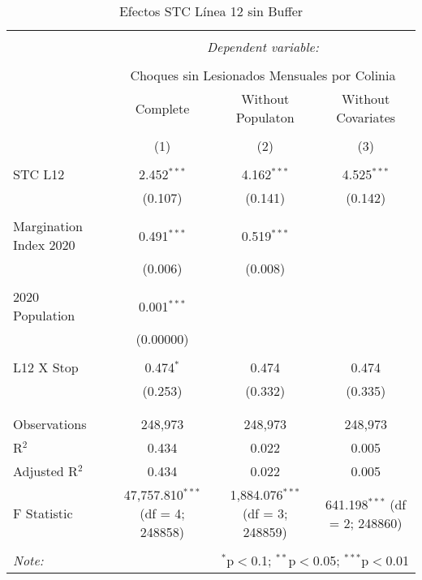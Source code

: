 
\begin{table}[!htbp] \centering 
  \caption{Efectos STC Línea 12 sin Buffer} 
  \label{} 
\begin{tabular}{@{\extracolsep{5pt}}lccc} 
\\[-1.8ex]\hline 
\hline \\[-1.8ex] 
 & \multicolumn{3}{c}{\textit{Dependent variable:}} \\ 
\cline{2-4} 
\\[-1.8ex] & \multicolumn{3}{c}{Choques sin Lesionados Mensuales por Colinia} \\ 
 & Complete & Without Populaton & Without Covariates \\ 
\\[-1.8ex] & (1) & (2) & (3)\\ 
\hline \\[-1.8ex] 
 STC L12 & 2.452$^{***}$ & 4.162$^{***}$ & 4.525$^{***}$ \\ 
  & (0.107) & (0.141) & (0.142) \\ 
  & & & \\ 
 Margination Index 2020 & 0.491$^{***}$ & 0.519$^{***}$ &  \\ 
  & (0.006) & (0.008) &  \\ 
  & & & \\ 
 2020 Population & 0.001$^{***}$ &  &  \\ 
  & (0.00000) &  &  \\ 
  & & & \\ 
 L12 X Stop & 0.474$^{*}$ & 0.474 & 0.474 \\ 
  & (0.253) & (0.332) & (0.335) \\ 
  & & & \\ 
\hline \\[-1.8ex] 
Observations & 248,973 & 248,973 & 248,973 \\ 
R$^{2}$ & 0.434 & 0.022 & 0.005 \\ 
Adjusted R$^{2}$ & 0.434 & 0.022 & 0.005 \\ 
F Statistic & 47,757.810$^{***}$ (df = 4; 248858) & 1,884.076$^{***}$ (df = 3; 248859) & 641.198$^{***}$ (df = 2; 248860) \\ 
\hline 
\hline \\[-1.8ex] 
\textit{Note:}  & \multicolumn{3}{r}{$^{*}$p$<$0.1; $^{**}$p$<$0.05; $^{***}$p$<$0.01} \\ 
\end{tabular} 
\end{table} 
